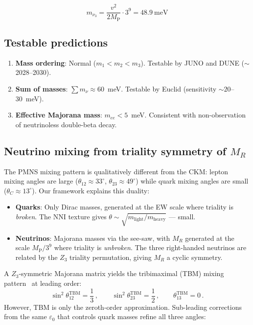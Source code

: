 \documentclass[12pt,a4paper]{article}
\theoremstyle{definition}
\theoremstyle{remark}
\newcommand{\MP}{M_{\mathrm{P}}}
\newcommand{\MR}{M_R}
\begin{document}
\begin{equation}
\boxed{m_{\nu_3} = \frac{v^2}{2\MP}\cdot 3^9 = 48.9~\text{meV}}
\end{equation}

\subsection{Testable predictions}

\begin{enumerate}
\item \textbf{Mass ordering}: Normal ($m_1 < m_2 < m_3$). Testable by 
JUNO and DUNE ($\sim$2028--2030).
\item \textbf{Sum of masses}: $\sum m_\nu \approx 60$~meV. Testable by 
Euclid (sensitivity $\sim 20$--30~meV).
\item \textbf{Effective Majorana mass}: $m_{ee} < 5$~meV. Consistent with 
non-observation of neutrinoless double-beta decay.
\end{enumerate}

\subsection{Neutrino mixing from triality symmetry of $\MR$}

The PMNS mixing pattern is qualitatively different from the CKM: lepton 
mixing angles are large ($\theta_{12}\approx 33^\circ$, 
$\theta_{23}\approx 49^\circ$) while quark mixing angles are small 
($\theta_C \approx 13^\circ$). Our framework explains this duality:

\begin{itemize}
\item \textbf{Quarks}: Only Dirac masses, generated at the EW scale where 
triality is \emph{broken}. The NNI texture gives 
$\theta\sim\sqrt{m_{\text{light}}/m_{\text{heavy}}}$ --- small.
\item \textbf{Neutrinos}: Majorana masses via the see-saw, with $\MR$ 
generated at the scale $\MP/3^9$ where triality is \emph{unbroken}. The 
three right-handed neutrinos are related by the $Z_3$ triality permutation, 
giving $\MR$ a cyclic symmetry.
\end{itemize}

A $Z_3$-symmetric Majorana matrix yields the tribimaximal (TBM) mixing 
pattern~\cite{Harrison2002} at leading order:
\begin{equation}
\sin^2\theta_{12}^{\text{TBM}} = \frac{1}{3}\,, \qquad 
\sin^2\theta_{23}^{\text{TBM}} = \frac{1}{2}\,, \qquad 
\theta_{13}^{\text{TBM}} = 0\,.
\end{equation}
However, TBM is only the zeroth-order approximation. Sub-leading corrections 
from the same $\varepsilon_0$ that controls quark masses refine all three angles:
\end{document}
